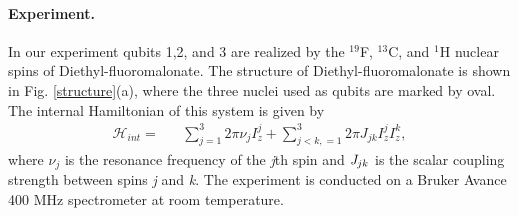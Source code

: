\documentclass[twocolumn,showpacs,twoside,10pt,prl]{revtex4}
\begin{document}




\paragraph*{Experiment.}

In our experiment qubits 1,2, and 3 are realized by the $^{19}$F, $^{13}$C, and $^1$H nuclear spins of Diethyl-fluoromalonate.  The structure of Diethyl-fluoromalonate is shown in Fig. \ref{structure}(a), where the three nuclei used as qubits are marked by oval. The internal Hamiltonian of this system is given by
\begin{eqnarray}\label{Hamiltonian}
\mathcal{H}_{int}=&&\sum\limits_{j=1}^3 {2\pi \nu _j } I_z^j  + \sum\limits_{j < k,=1}^3 {2\pi} J_{jk} I_z^j I_z^k,
\end{eqnarray}
where $\nu_j$ is the resonance frequency of the \emph{j}th spin and
$\emph{J}_{jk}$ is the scalar coupling strength between spins \emph{j} and
\emph{k}. The experiment is conducted on a Bruker Avance 400 MHz spectrometer at room temperature.
\end{document}
